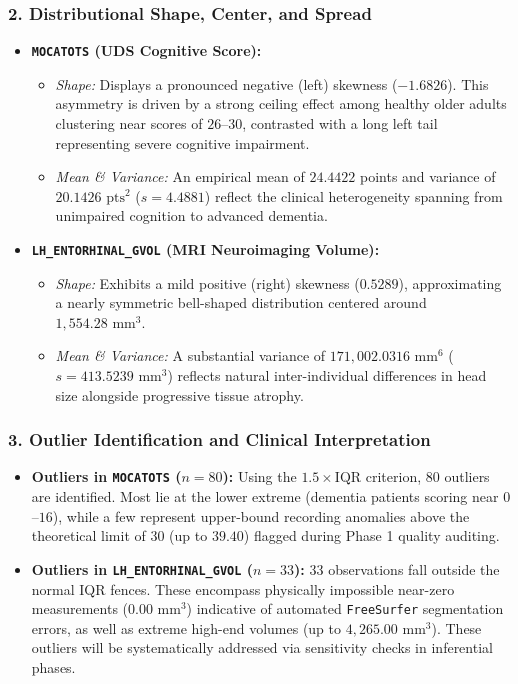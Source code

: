 \documentclass[11pt, a4paper]{article}
\begin{document}
\subsubsection*{2. Distributional Shape, Center, and Spread}
\begin{itemize}
    \item \textbf{\texttt{MOCATOTS} (UDS Cognitive Score):}
    \begin{itemize}
        \item \textit{Shape:} Displays a pronounced negative (left) skewness ($-1.6826$). This asymmetry is driven by a strong ceiling effect among healthy older adults clustering near scores of $26$--$30$, contrasted with a long left tail representing severe cognitive impairment.
        \item \textit{Mean \& Variance:} An empirical mean of $24.4422$ points and variance of $20.1426\text{ pts}^2$ ($s = 4.4881$) reflect the clinical heterogeneity spanning from unimpaired cognition to advanced dementia.
    \end{itemize}
    \item \textbf{\texttt{LH\_ENTORHINAL\_GVOL} (MRI Neuroimaging Volume):}
    \begin{itemize}
        \item \textit{Shape:} Exhibits a mild positive (right) skewness ($0.5289$), approximating a nearly symmetric bell-shaped distribution centered around $1,554.28\text{ mm}^3$.
        \item \textit{Mean \& Variance:} A substantial variance of $171,002.0316\text{ mm}^6$ ($s = 413.5239\text{ mm}^3$) reflects natural inter-individual differences in head size alongside progressive tissue atrophy.
    \end{itemize}
\end{itemize}

\subsubsection*{3. Outlier Identification and Clinical Interpretation}
\begin{itemize}
    \item \textbf{Outliers in \texttt{MOCATOTS} ($n = 80$):} Using the $1.5 \times \text{IQR}$ criterion, $80$ outliers are identified. Most lie at the lower extreme (dementia patients scoring near $0$--$16$), while a few represent upper-bound recording anomalies above the theoretical limit of $30$ (up to $39.40$) flagged during Phase 1 quality auditing.
    \item \textbf{Outliers in \texttt{LH\_ENTORHINAL\_GVOL} ($n = 33$):} $33$ observations fall outside the normal IQR fences. These encompass physically impossible near-zero measurements ($0.00\text{ mm}^3$) indicative of automated \texttt{FreeSurfer} segmentation errors, as well as extreme high-end volumes (up to $4,265.00\text{ mm}^3$). These outliers will be systematically addressed via sensitivity checks in inferential phases.
\end{itemize}
\end{document}
